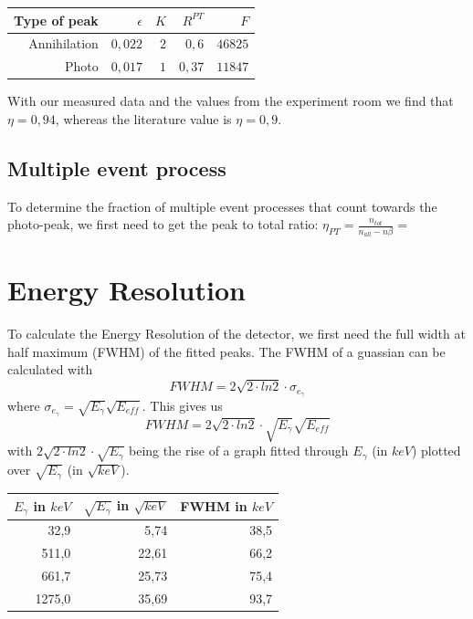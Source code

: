 \documentclass[bigchapter,colorback,accentcolor=tud4b,linedtoc,11pt]{tudreport}
\begin{document}
\begin{center}
  \begin{tabular}{r|r|r|r|r|}
     Type of peak & $\epsilon$ & $K$ & $R^{PT}$ & $F$     \\ \hline
     Annihilation & $0,022$    & $2$ & $0,6$    & $46825$ \\ \hline
     Photo        & $0,017$    & $1$ & $0,37$   & $11847$ \\
	\end{tabular}
\end{center}

With our measured data and the values from the experiment room we find that $\eta = 0,94$, whereas the literature value is $\eta = 0,9$.

\subsection{Multiple event process}
To determine the fraction of multiple event processes that count towards the
photo-peak, we first need to get the peak to total ratio: $\eta_{PT}=\frac{n_{tot}}{n_{all}-n\beta}=$


\section{Energy Resolution}

To calculate the Energy Resolution of the detector, we first need the full width
at half maximum (FWHM) of the fitted peaks. The FWHM of a guassian can be
calculated with
$$FWHM = 2 \sqrt{2 \cdot ln2} \cdot \sigma_{e_{\gamma}}$$
where $\sigma_{e_{\gamma}} = \sqrt{E_\gamma}\sqrt{E_{eff}}$. This gives us
$$FWHM = 2 \sqrt{2 \cdot ln2} \cdot \sqrt{E_\gamma}\sqrt{E_{eff}}$$
with $2 \sqrt{2 \cdot ln2} \cdot \sqrt{E_\gamma}$ being the rise of a graph
fitted through $E_\gamma$ (in $keV$) plotted over $\sqrt{E_\gamma}$ (in $\sqrt{keV}$).

\begin{center}
  \begin{tabular}{r|r|r}
    $E_\gamma$ in $keV$ & $\sqrt{E_\gamma}$ in $\sqrt{keV}$ & FWHM in $keV$ \\ \hline
    32,9                & 5,74                              & 38,5          \\ \hline
    511,0               & 22,61                             & 66,2          \\ \hline
    661,7               & 25,73                             & 75,4          \\ \hline
    1275,0              & 35,69                             & 93,7          \\

	\end{tabular}
\end{center}
\end{document}
